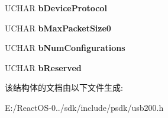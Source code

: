 \begin{DoxyCompactItemize}
\mbox{\label{struct___u_s_b___d_e_v_i_c_e___q_u_a_l_i_f_i_e_r___d_e_s_c_r_i_p_t_o_r_a7fbd7a22410d5f3e68c981d48e909908}} 
U\+C\+H\+AR {\bfseries b\+Device\+Protocol}
\item 
\mbox{\label{struct___u_s_b___d_e_v_i_c_e___q_u_a_l_i_f_i_e_r___d_e_s_c_r_i_p_t_o_r_a8434f6320a7d7fc4ee3e87ba3f56b137}} 
U\+C\+H\+AR {\bfseries b\+Max\+Packet\+Size0}
\item 
\mbox{\label{struct___u_s_b___d_e_v_i_c_e___q_u_a_l_i_f_i_e_r___d_e_s_c_r_i_p_t_o_r_a5b325fe64722c9cd00ffc82ae1ac0f6f}} 
U\+C\+H\+AR {\bfseries b\+Num\+Configurations}
\item 
\mbox{\label{struct___u_s_b___d_e_v_i_c_e___q_u_a_l_i_f_i_e_r___d_e_s_c_r_i_p_t_o_r_a0fbc5faa958647736fdb744e2099c44a}} 
U\+C\+H\+AR {\bfseries b\+Reserved}
\end{DoxyCompactItemize}


该结构体的文档由以下文件生成\+:\begin{DoxyCompactItemize}
\item 
E\+:/\+React\+O\+S-\/0../sdk/include/psdk/usb200.\+h\end{DoxyCompactItemize}
